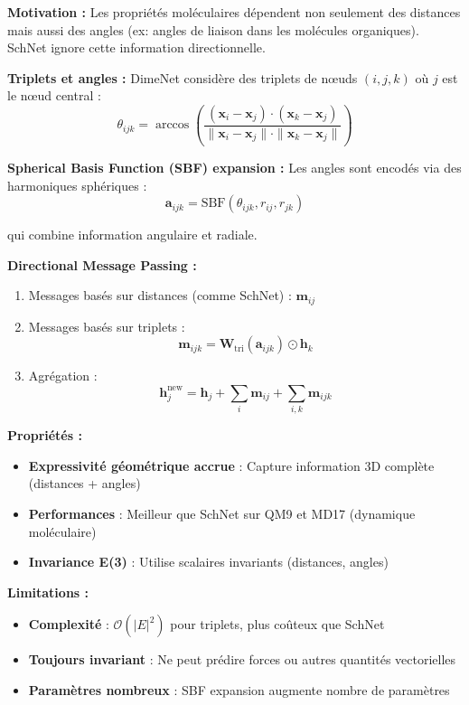 \textbf{Motivation :}
Les propriétés moléculaires dépendent non seulement des distances mais aussi des angles (ex: angles de liaison dans les molécules organiques). SchNet ignore cette information directionnelle.

\textbf{Triplets et angles :}
DimeNet considère des triplets de nœuds $(i, j, k)$ où $j$ est le nœud central :
\[
\theta_{ijk} = \arccos\left(\frac{(\mathbf{x}_i - \mathbf{x}_j) \cdot (\mathbf{x}_k - \mathbf{x}_j)}{\|\mathbf{x}_i - \mathbf{x}_j\| \cdot \|\mathbf{x}_k - \mathbf{x}_j\|}\right)
\]

\textbf{Spherical Basis Function (SBF) expansion :}
Les angles sont encodés via des harmoniques sphériques :
\[
\mathbf{a}_{ijk} = \text{SBF}(\theta_{ijk}, r_{ij}, r_{jk})
\]

qui combine information angulaire et radiale.

\textbf{Directional Message Passing :}
\begin{enumerate}
    \item Messages basés sur distances (comme SchNet) : $\mathbf{m}_{ij}$
    \item Messages basés sur triplets :
    \[
    \mathbf{m}_{ijk} = \mathbf{W}_{\text{tri}}(\mathbf{a}_{ijk}) \odot \mathbf{h}_k
    \]
    \item Agrégation :
    \[
    \mathbf{h}_j^{\text{new}} = \mathbf{h}_j + \sum_i \mathbf{m}_{ij} + \sum_{i,k} \mathbf{m}_{ijk}
    \]
\end{enumerate}

\textbf{Propriétés :}
\begin{itemize}
    \item \textbf{Expressivité géométrique accrue} : Capture information 3D complète (distances + angles)
    \item \textbf{Performances} : Meilleur que SchNet sur QM9 et MD17 (dynamique moléculaire)
    \item \textbf{Invariance E(3)} : Utilise scalaires invariants (distances, angles)
\end{itemize}

\textbf{Limitations :}
\begin{itemize}
    \item \textbf{Complexité} : $\mathcal{O}(|E|^2)$ pour triplets, plus coûteux que SchNet
    \item \textbf{Toujours invariant} : Ne peut prédire forces ou autres quantités vectorielles
    \item \textbf{Paramètres nombreux} : SBF expansion augmente nombre de paramètres
\end{itemize}

